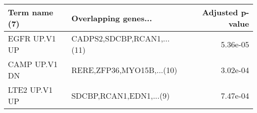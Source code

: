 \begin{tabular}{llr}
\toprule
Term name (7) &       Overlapping genes... &  Adjusted p-value \\
\midrule
EGFR UP.V1 UP & CADPS2,SDCBP,RCAN1,...(11) &          5.36e-05 \\
CAMP UP.V1 DN &  RERE,ZFP36,MYO15B,...(10) &          3.02e-04 \\
LTE2 UP.V1 UP &    SDCBP,RCAN1,EDN1,...(9) &          7.47e-04 \\
\bottomrule
\end{tabular}

